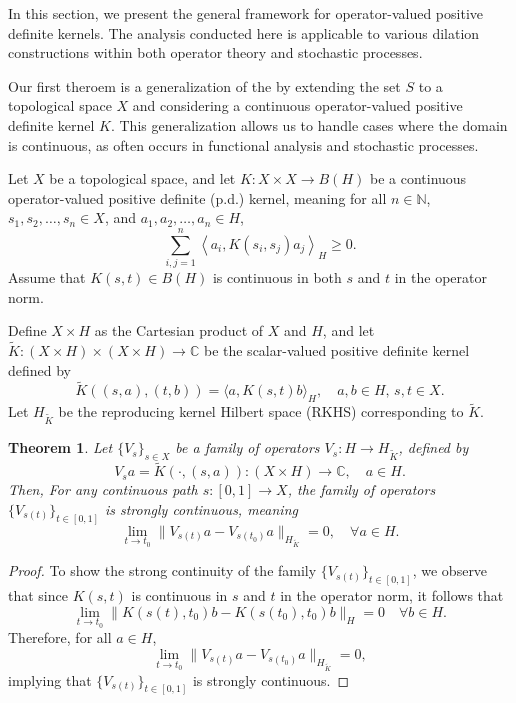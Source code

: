 \documentclass[11pt]{amsart}
\newtheorem{theorem}{Theorem}[section]
\theoremstyle{definition}
\numberwithin{equation}{section}
\begin{document}
In this section, we present the general framework for operator-valued positive definite kernels. The analysis conducted here is applicable to various dilation constructions within both operator theory and stochastic processes.

Our first theroem is a generalization of the \cite[Theorem 2.1]{Jorgensen2024} by extending the set \( S \) to a topological space \( X \) and considering a continuous operator-valued positive definite kernel \( K \). This generalization allows us to handle cases where the domain is continuous, as often occurs in functional analysis and stochastic processes.

Let \( X \) be a topological space, and let \( K: X \times X \to B(H) \) be a continuous operator-valued positive definite (p.d.) kernel, meaning for all \( n \in \mathbb{N} \), \( s_1, s_2, \dots, s_n \in X \), and \( a_1, a_2, \dots, a_n \in H \),
\[
\sum_{i,j=1}^{n} \left\langle a_i, K(s_i, s_j) a_j \right\rangle_H \geq 0.
\]
Assume that \( K(s,t) \in B(H) \) is continuous in both \( s \) and \( t \) in the operator norm.

Define \( X \times H \) as the Cartesian product of \( X \) and \( H \), and let \( \tilde{K}: (X \times H) \times (X \times H) \to \mathbb{C} \) be the scalar-valued positive definite kernel defined by
\[
\tilde{K}((s, a), (t, b)) = \langle a, K(s, t) b \rangle_H, \quad a, b \in H, \, s, t \in X.
\]
Let \( H_{\tilde{K}} \) be the reproducing kernel Hilbert space (RKHS) corresponding to \( \tilde{K} \).

\begin{theorem}
\label{thm:continuous}
Let \( \{ V_s \}_{s \in X} \) be a family of operators \( V_s: H \to H_{\tilde{K}} \), defined by
\[
V_s a = \tilde{K}(\cdot, (s, a)): (X \times H) \to \mathbb{C}, \quad a \in H.
\]
Then, For any continuous path \( s: [0, 1] \to X \), the family of operators \( \{ V_{s(t)} \}_{t \in [0, 1]} \) is strongly continuous, meaning
    \[
    \lim_{t \to t_0} \| V_{s(t)} a - V_{s(t_0)} a \|_{H_{\tilde{K}}} = 0, \quad \forall a \in H.
    \]
 
\end{theorem}

\begin{proof}
To show the strong continuity of the family \( \{ V_{s(t)} \}_{t \in [0, 1]} \), we observe that since \( K(s,t) \) is continuous in \( s \) and \( t \) in the operator norm, it follows that
    \[
    \lim_{t \to t_0} \|K(s(t), t_0) b - K(s(t_0), t_0) b\|_H = 0 \quad \forall b \in H.
    \]
    Therefore, for all \( a \in H \),
    \[
    \lim_{t \to t_0} \| V_{s(t)} a - V_{s(t_0)} a \|_{H_{\tilde{K}}} = 0,
    \]
    implying that \( \{ V_{s(t)} \}_{t \in [0, 1]} \) is strongly continuous.
\end{proof}
\end{document}
